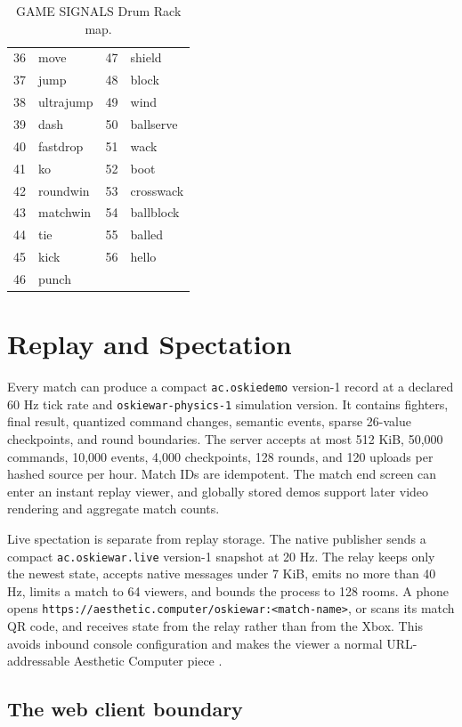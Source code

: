 \documentclass[10pt,letterpaper,twocolumn]{article}
\newcommand{\code}[1]{\texttt{#1}}
\begin{document}
\begin{table}[t]
\centering
\caption{GAME SIGNALS Drum Rack map.}
\label{tab:midi}
\scriptsize
\begin{tabular}{@{}rl@{\quad}rl@{}}
\toprule
36&move&47&shield\\
37&jump&48&block\\
38&ultrajump&49&wind\\
39&dash&50&ballserve\\
40&fastdrop&51&wack\\
41&ko&52&boot\\
42&roundwin&53&crosswack\\
43&matchwin&54&ballblock\\
44&tie&55&balled\\
45&kick&56&hello\\
46&punch&&\\
\bottomrule
\end{tabular}
\end{table}

\section{Replay and Spectation}

Every match can produce a compact \code{ac.oskiedemo} version-1 record at a declared 60 Hz tick rate and \code{oskiewar-physics-1} simulation version. It contains fighters, final result, quantized command changes, semantic events, sparse 26-value checkpoints, and round boundaries. The server accepts at most 512 KiB, 50,000 commands, 10,000 events, 4,000 checkpoints, 128 rounds, and 120 uploads per hashed source per hour. Match IDs are idempotent. The match end screen can enter an instant replay viewer, and globally stored demos support later video rendering and aggregate match counts.

Live spectation is separate from replay storage. The native publisher sends a compact \code{ac.oskiewar.live} version-1 snapshot at 20 Hz. The relay keeps only the newest state, accepts native messages under 7 KiB, emits no more than 40 Hz, limits a match to 64 viewers, and bounds the process to 128 rooms. A phone opens \code{https://aesthetic.computer/oskiewar:<match-name>}, or scans its match QR code, and receives state from the relay rather than from the Xbox. This avoids inbound console configuration and makes the viewer a normal URL-addressable Aesthetic Computer piece \cite{scudderURL}.

\subsection{The web client boundary}
\end{document}
